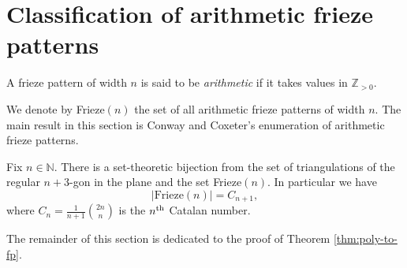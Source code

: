 \chapter{Classification of arithmetic frieze patterns}
\begin{definition}
\label{def:arith-fp}
    A frieze pattern of width $n$ is said to be \textit{arithmetic} if it takes values in $\mathbb{Z}_{>0}$. 
\end{definition}

We denote by Frieze$(n)$ the set of all arithmetic frieze patterns of width $n$. The main result in this section 
is Conway and Coxeter's enumeration of arithmetic frieze patterns. 

\begin{theorem}
\label{thm:poly-to-fp}
    Fix $n \in \mathbb{N}$. There is a set-theoretic bijection from the set of triangulations of the regular $n+3$-gon in the plane
    and the set Frieze$(n)$. In particular we have
    \[
        |\text{Frieze}(n)| = C_{n+1},
    \]
    where $C_n = \frac{1}{n+1}\binom{2n}{n}$ is the $n^{\rm th}$ Catalan number.
\end{theorem}

The remainder of this section is dedicated to the proof of Theorem \ref{thm:poly-to-fp}. 

